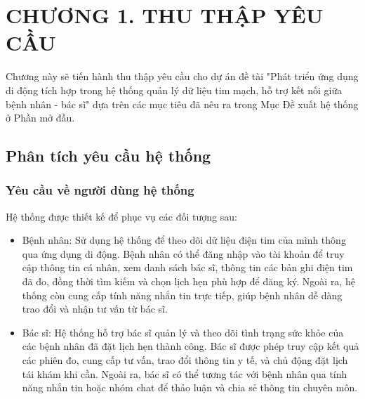 
\section*{CHƯƠNG 1. THU THẬP YÊU CẦU}
\setcounter{section}{1}
\setcounter{subsection}{0} %
\setcounter{table}{0} %
\setcounter{figure}{0} %
Chương này sẽ tiến hành thu thập yêu cầu cho dự án đề tài "Phát triển ứng dụng di động tích hợp trong hệ thống quản lý dữ liệu tim mạch, hỗ trợ kết nối giữa bệnh nhân - bác sĩ"
dựa trên các mục tiêu đã nêu ra trong Mục Đề xuất hệ thống ở Phần mở đầu.

\subsection{Phân tích yêu cầu hệ thống}
\subsubsection{Yêu cầu về người dùng hệ thống}
Hệ thống được thiết kế để phục vụ các đối tượng sau:
\begin{adjustwidth}{1.5em}{}
\begin{itemize}
    \item Bệnh nhân: Sử dụng hệ thống để theo dõi dữ liệu điện tim của mình thông qua ứng dụng di động. 
    Bệnh nhân có thể đăng nhập vào tài khoản để truy cập thông tin cá nhân, xem danh sách bác sĩ, thông tin các bản ghi điện tim đã đo, đồng thời tìm kiếm và chọn lịch hẹn phù hợp để đăng ký.
    Ngoài ra, hệ thống còn cung cấp tính năng nhắn tin trực tiếp, giúp bệnh nhân dễ dàng trao đổi và nhận tư vấn từ bác sĩ.
    
    \item Bác sĩ: Hệ thống hỗ trợ bác sĩ quản lý và theo dõi tình trạng sức khỏe của các bệnh nhân đã đặt lịch hẹn thành công. Bác sĩ được phép truy cập kết quả các phiên đo, cung cấp tư vấn, trao đổi thông tin y tế, và chủ động đặt lịch tái khám khi cần.
    Ngoài ra, bác sĩ có thể tương tác với bệnh nhân qua tính năng nhắn tin hoặc nhóm chat để thảo luận và chia sẻ thông tin chuyên môn.
    

\end{itemize}
\end{adjustwidth}

